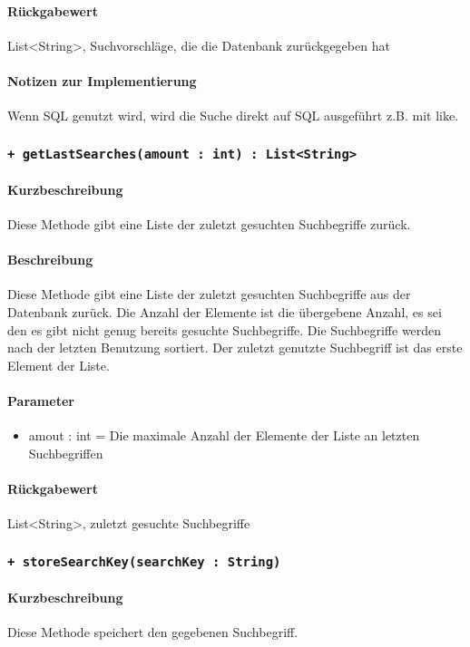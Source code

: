\paragraph*{Rückgabewert}
List<String>, Suchvorschläge, die die Datenbank zurückgegeben hat
\paragraph*{Notizen zur Implementierung}
Wenn SQL genutzt wird, wird die Suche direkt auf SQL ausgeführt z.B. mit \dq like\dq{}.

\subsubsection{\texttt{+ getLastSearches(amount : int) : List<String>}}%
\paragraph*{Kurzbeschreibung}
Diese Methode gibt eine Liste der zuletzt gesuchten Suchbegriffe zurück.
\paragraph*{Beschreibung}
Diese Methode gibt eine Liste der zuletzt gesuchten Suchbegriffe aus der Datenbank zurück.
Die Anzahl der Elemente ist die übergebene Anzahl, es sei den es gibt nicht genug bereits gesuchte Suchbegriffe.
Die Suchbegriffe werden nach der letzten Benutzung sortiert. 
Der zuletzt genutzte Suchbegriff ist das erste Element der Liste.
\paragraph*{Parameter}
\begin{itemize}
    \item amout : int = Die maximale Anzahl der Elemente der Liste an letzten Suchbegriffen
\end{itemize}
\paragraph*{Rückgabewert}
List<String>, zuletzt gesuchte Suchbegriffe

\subsubsection{\texttt{+ storeSearchKey(searchKey : String)}}%
\paragraph*{Kurzbeschreibung}
Diese Methode speichert den gegebenen Suchbegriff.
